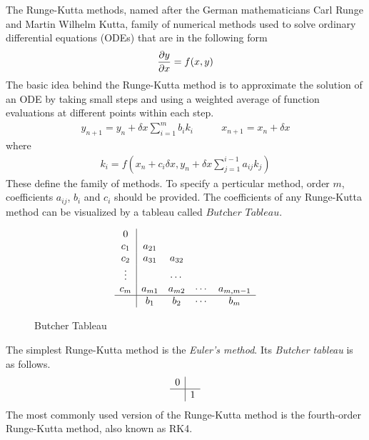 \documentclass{article}
\begin{document}
The Runge-Kutta methods, named after the German mathematicians Carl Runge and Martin Wilhelm Kutta, family of numerical methods
used to solve ordinary differential equations (ODEs) that are in the following form
\begin{equation} \label{eq:first-order-ODE}
    \frac{\partial y}{\partial x} = f(x, y)
\end{equation}
The basic idea behind the Runge-Kutta method is to approximate the solution of an ODE by taking small steps and using a weighted average 
of function evaluations at different points within each step.
\begin{equation} \label{eq:general-rk}
    \begin{aligned}
        y_{n+1} = y_n + \delta x \sum_{i=1}^{m} b_i k_i
    \end{aligned}
    \qquad
    \begin{aligned}
        x_{n+1} = x_n + \delta x 
    \end{aligned}
\end{equation}
where 
\begin{eqnarray} \label{eq:general-rk-coef}
    k_i = f(x_n + c_i \delta x, y_n + \delta x \sum_{j = 1}^{i - 1}a_{ij}k_j)
\end{eqnarray}
These  define the family of methods. To specify a perticular method, order $m$, coefficients $a_{ij}$, $b_i$ and $c_i$ should be provided.
The coefficients of any Runge-Kutta method can be visualized by a tableau called $\textit{Butcher Tableau}$.
\begin{figure}[h!]
    \[ 
    \begin{array} 
        {c|cccc}
        0\\
        c_1 & a_{21} \\
        c_2 & a_{31} & a_{32}\\
        \vdots& & \cdots& \\
        c_m & a_{m1} & a_{m2} & \cdots & a_{m,m-1}\\
        \hline
        & b_1 & b_2 &\cdots & b_m
    \end{array}
    \]
    \caption{Butcher Tableau}
    \label{fig:Butcher}
\end{figure}
The simplest Runge-Kutta method is the \textit{Euler's method}. Its \textit{Butcher tableau} is as follows.
\[ 
    \begin{array} 
        {c|cccc}
        0\\
        \hline
        & 1
    \end{array}
\]
The most commonly used version of the Runge-Kutta method is the fourth-order Runge-Kutta method, also known as RK4. 
\end{document}

